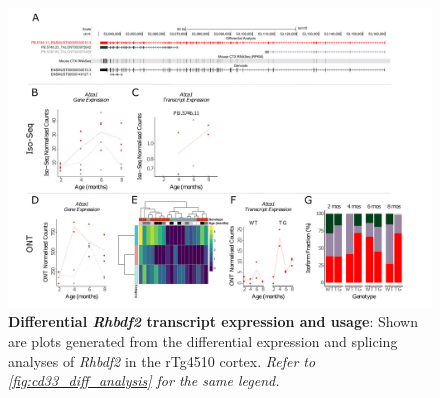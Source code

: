 \begin{landscape}
	\begin{figure}[htp]
		\begin{center}
			\includegraphics[page=14,trim={0 0.5cm 0 1.5cm},scale =0.85]{Figures/TargetGene_DifferentialAnalysis.pdf}
		\end{center}
		\captionsetup{width=1.5\textwidth}
		\caption[Differential \textit{Rhbdf2} transcript expression and usage]%
		{\textbf{Differential \textit{Rhbdf2} transcript expression and usage}: Shown are plots generated from the differential expression and splicing analyses of \textit{Rhbdf2} in the rTg4510 cortex. \textit{Refer to \cref{fig:cd33_diff_analysis} for the same legend.}}   
		\label{fig:Rhbdf2_diff_analysis}
	\end{figure}
\end{landscape}

